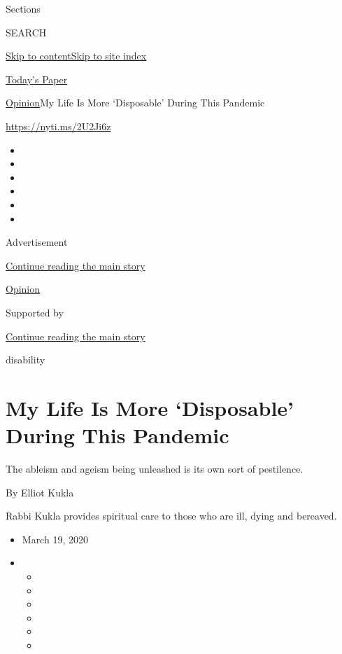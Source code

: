 Sections

SEARCH

\protect\hyperlink{site-content}{Skip to
content}\protect\hyperlink{site-index}{Skip to site index}

\href{https://myaccount.nytimes3xbfgragh.onion/auth/login?response_type=cookie\&client_id=vi}{}

\href{https://www.nytimes3xbfgragh.onion/section/todayspaper}{Today's
Paper}

\href{/section/opinion}{Opinion}\textbar{}My Life Is More `Disposable'
During This Pandemic

\url{https://nyti.ms/2U2Ji6z}

\begin{itemize}
\item
\item
\item
\item
\item
\item
\end{itemize}

Advertisement

\protect\hyperlink{after-top}{Continue reading the main story}

\href{/section/opinion}{Opinion}

Supported by

\protect\hyperlink{after-sponsor}{Continue reading the main story}

disability

\hypertarget{my-life-is-more-disposable-during-this-pandemic}{%
\section{My Life Is More `Disposable' During This
Pandemic}\label{my-life-is-more-disposable-during-this-pandemic}}

The ableism and ageism being unleashed is its own sort of pestilence.

By Elliot Kukla

Rabbi Kukla provides spiritual care to those who are ill, dying and
bereaved.

\begin{itemize}
\item
  March 19, 2020
\item
  \begin{itemize}
  \item
  \item
  \item
  \item
  \item
  \item
  \end{itemize}
\end{itemize}

